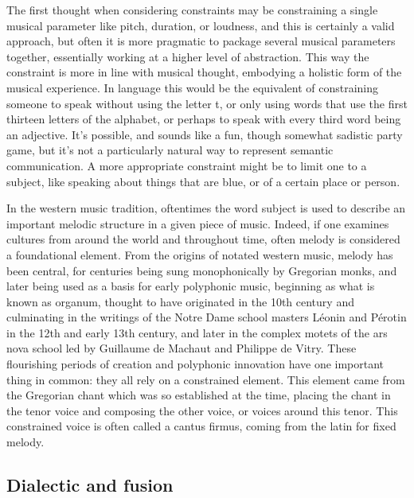\documentclass[12pt,twoside,maitrise]{dms_ks}
\theoremstyle{definition}
\begin{document}
The first thought when considering constraints may be constraining a single musical parameter like pitch, duration, or loudness, and this is certainly a valid approach, but often it is more pragmatic to package several musical parameters together, essentially working at a higher level of abstraction.
This way the constraint is more in line with musical thought, embodying a holistic form of the musical experience.
In language this would be the equivalent of constraining someone to speak without using the letter t, or only using words that use the first thirteen letters of the alphabet, or perhaps to speak with every third word being an adjective.
It’s possible, and sounds like a fun, though somewhat sadistic party game, but it’s not a particularly natural way to represent semantic communication.
A more appropriate constraint might be to limit one to a subject, like speaking about things that are blue, or of a certain place or person.

In the western music tradition, oftentimes the word subject is used to describe an important melodic structure in a given piece of music.
Indeed, if one examines cultures from around the world and throughout time, often melody is considered a foundational element.
From the origins of notated western music, melody has been central, for centuries being sung monophonically by Gregorian monks, and later being used as a basis for early polyphonic music, beginning as what is known as organum, thought to have originated in the 10th century and culminating in the writings of the Notre Dame school masters Léonin and Pérotin in the 12th and early 13th century, and later in the complex motets of the ars nova school led by Guillaume de Machaut and Philippe de Vitry.
These flourishing periods of creation and polyphonic innovation have one important thing in common: they all rely on a constrained element.
This element came from the Gregorian chant which was so established at the time, placing the chant in the tenor voice and composing the other voice, or voices around this tenor.
This constrained voice is often called a cantus firmus, coming from the latin for fixed melody.

\subsection{Dialectic and fusion}
\end{document}
